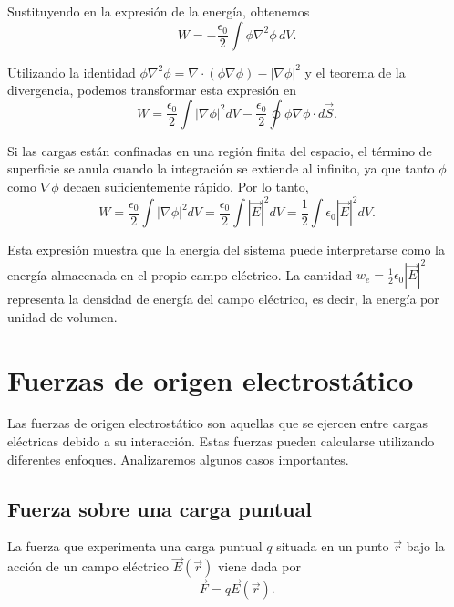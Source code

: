 \documentclass[12pt,a4paper]{book}
\begin{document}
Sustituyendo en la expresión de la energía, obtenemos
\begin{equation}
W = -\frac{\epsilon_0}{2} \int \phi \nabla^2\phi\, dV.
\end{equation}

Utilizando la identidad $\phi \nabla^2\phi = \nabla \cdot (\phi \nabla\phi) - |\nabla\phi|^2$ y el teorema de la divergencia, podemos transformar esta expresión en
\begin{equation}
W = \frac{\epsilon_0}{2} \int |\nabla\phi|^2 dV - \frac{\epsilon_0}{2} \oint \phi \nabla\phi \cdot d\vec{S}.
\end{equation}

Si las cargas están confinadas en una región finita del espacio, el término de superficie se anula cuando la integración se extiende al infinito, ya que tanto $\phi$ como $\nabla\phi$ decaen suficientemente rápido. Por lo tanto,
\begin{equation}
W = \frac{\epsilon_0}{2} \int |\nabla\phi|^2 dV = \frac{\epsilon_0}{2} \int |\vec{E}|^2 dV = \frac{1}{2} \int \epsilon_0 |\vec{E}|^2 dV.
\end{equation}

Esta expresión muestra que la energía del sistema puede interpretarse como la energía almacenada en el propio campo eléctrico. La cantidad $w_e = \frac{1}{2}\epsilon_0 |\vec{E}|^2$ representa la densidad de energía del campo eléctrico, es decir, la energía por unidad de volumen.

\section{Fuerzas de origen electrostático}

Las fuerzas de origen electrostático son aquellas que se ejercen entre cargas eléctricas debido a su interacción. Estas fuerzas pueden calcularse utilizando diferentes enfoques. Analizaremos algunos casos importantes.

\subsection{Fuerza sobre una carga puntual}

La fuerza que experimenta una carga puntual $q$ situada en un punto $\vec{r}$ bajo la acción de un campo eléctrico $\vec{E}(\vec{r})$ viene dada por
\begin{equation}
\vec{F} = q\vec{E}(\vec{r}).
\end{equation}
\end{document}
